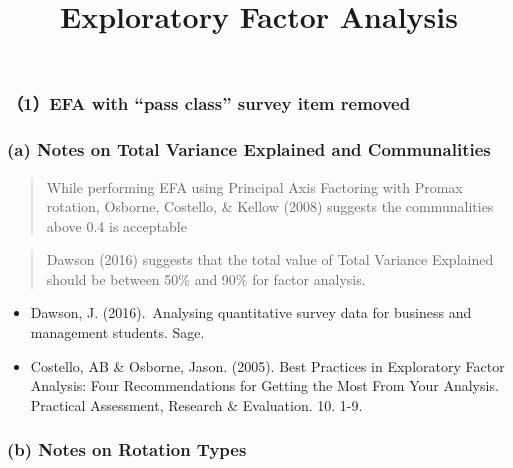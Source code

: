 \documentclass[
]{article}
\title{Exploratory Factor Analysis}
\author{}
\date{\vspace{-2.5em}}
\begin{document}
\maketitle

\hypertarget{efa-with-pass-class-survey-item-removed}{%
\subsubsection{（1）EFA with ``pass class'' survey item
removed}\label{efa-with-pass-class-survey-item-removed}}

\hypertarget{a-notes-on-total-variance-explained-and-communalities}{%
\subsubsection{(a) Notes on Total Variance Explained and
Communalities}\label{a-notes-on-total-variance-explained-and-communalities}}

\begin{quote}
While performing EFA using Principal Axis Factoring with Promax
rotation, Osborne, Costello, \& Kellow (2008) suggests the communalities
above 0.4 is acceptable
\end{quote}

\begin{quote}
Dawson (2016) suggests that the total value of Total Variance Explained
should be between 50\% and 90\% for factor analysis.
\end{quote}

\begin{itemize}
\item
  Dawson, J. (2016).~Analysing quantitative survey data for business and
  management students. Sage.
\item
  Costello, AB \& Osborne, Jason. (2005). Best Practices in Exploratory
  Factor Analysis: Four Recommendations for Getting the Most From Your
  Analysis. Practical Assessment, Research \& Evaluation. 10. 1-9.
\end{itemize}

\hypertarget{b-notes-on-rotation-types}{%
\subsubsection{(b) Notes on Rotation
Types}\label{b-notes-on-rotation-types}}
\end{document}
